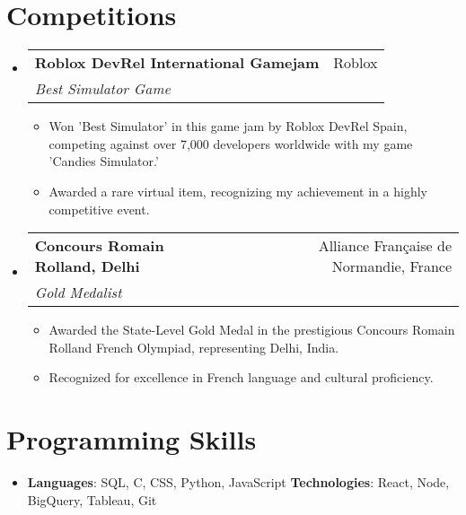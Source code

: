 \documentclass[letterpaper,11pt]{article}
\makeatletter
\newcommand{\resumeSubheading}[4]{
  \vspace{-1pt}\item
    \begin{tabular*}{0.97\textwidth}{l@{\extracolsep{\fill}}r}
      \textbf{#1} & #2 \\
      \textit{\small#3} & \textit{\small #4} \\
    \end{tabular*}\vspace{-5pt}
}
\newcommand{\resumeSubHeadingListStart}{\begin{itemize}[leftmargin=*]}
\newcommand{\resumeSubHeadingListEnd}{\end{itemize}}
\newcommand{\resumeItemListStart}{\begin{itemize}}
\newcommand{\resumeItemListEnd}{\end{itemize}\vspace{-5pt}}
\makeatother
\begin{document}
\section*{Competitions}
\resumeSubHeadingListStart
  \resumeSubheading
    {Roblox DevRel International Gamejam}{Roblox}
    {Best Simulator Game}{}
    \resumeItemListStart
      \item Won 'Best Simulator' in this game jam by Roblox DevRel Spain, competing against over 7,000 developers worldwide with my game 'Candies Simulator.' 
      \item Awarded a rare virtual item, recognizing my achievement in a highly competitive event.
    \resumeItemListEnd
  
  \resumeSubheading
    {Concours Romain Rolland, Delhi}{Alliance Française de Normandie, France}
    {Gold Medalist}{}
    \resumeItemListStart
      \item Awarded the State-Level Gold Medal in the prestigious Concours Romain Rolland French Olympiad, representing Delhi, India.
      \item Recognized for excellence in French language and cultural proficiency.
    \resumeItemListEnd
\resumeSubHeadingListEnd

\section*{Programming Skills}
\resumeSubHeadingListStart
  \item{
    \textbf{Languages}{: SQL, C, CSS, Python, JavaScript}
    \hfill
    \textbf{Technologies}{: React, Node, BigQuery, Tableau, Git}
  }
\resumeSubHeadingListEnd
\end{document}
